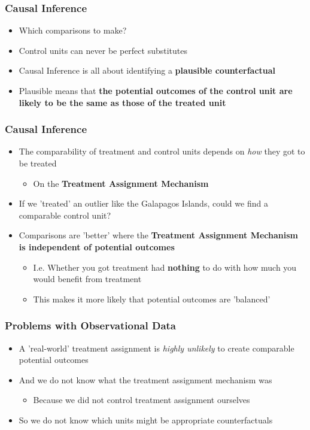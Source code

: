 \documentclass[xcolor=x11names,compress]{beamer}\usepackage[]{graphicx}\usepackage[]{color}
\renewcommand{\(}{\begin{columns}}
\renewcommand{\)}{\end{columns}}
\newcommand{\<}[1]{\begin{column}{#1}}
\renewcommand{\>}{\end{column}}
\begin{document}
\begin{frame}
\frametitle{Causal Inference}
\begin{itemize}
\item Which comparisons to make? 
\pause
\item Control units can never be perfect substitutes
\pause
\item Causal Inference is all about identifying a \textbf{plausible counterfactual}
\pause
\item Plausible means that \textbf{the potential outcomes of the control unit are likely to be the same as those of the treated unit}
\end{itemize}
\end{frame}

\begin{frame}
\frametitle{Causal Inference}
\begin{itemize}
\item The comparability of treatment and control units depends on \textit{how} they got to be treated
\pause
\begin{itemize}
\item On the \textbf{Treatment Assignment Mechanism}
\pause
\end{itemize}
\item If we 'treated' an outlier like the Galapagos Islands, could we find a comparable control unit?
\pause
\item Comparisons are 'better' where the \textbf{Treatment Assignment Mechanism is independent of potential outcomes}
\pause
\begin{itemize}
\item I.e. Whether you got treatment had \textbf{nothing} to do with how much you would benefit from treatment 
\item This makes it more likely that potential outcomes are 'balanced'
\end{itemize}
\end{itemize}
\end{frame}

\begin{frame}
\frametitle{Problems with Observational Data}
\begin{itemize}
\item A 'real-world' treatment assignment is \textit{highly unlikely} to create comparable potential outcomes
\pause
\item And we do not know what the treatment assignment mechanism was
\begin{itemize}
\item Because we did not control treatment assignment ourselves
\pause
\end{itemize}
\pause
\item So we do not know which units might be appropriate counterfactuals
\end{itemize}
\end{frame}
\end{document}
